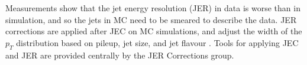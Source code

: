 Measurements show that the jet energy resolution (JER) in data is worse than in simulation, and so the jets in MC need to be smeared to describe the data. JER corrections are applied after JEC on MC simulations, and adjust the width of the $p_{T}$ distribution based on pileup, jet size, and jet flavour \cite{twiki_JetResolution_JER}. Tools for applying JEC and JER are provided centrally by the JER Corrections group. 